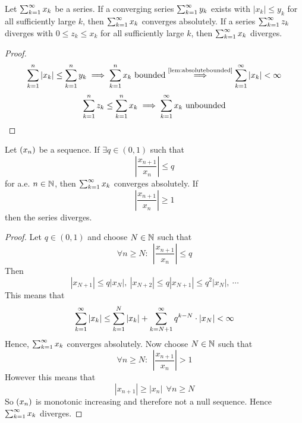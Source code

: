 \documentclass[../../script.tex]{subfiles}
\begin{document}
\begin{thm}
Let $\series{k} x_k$ be a series. If a converging series $\series{k} y_k$ exists with $|x_k| \le y_k$ for all sufficiently large $k$, then $\series{k} x_k$ converges absolutely. If a series $\series{k} z_k$ diverges with $0 \le z_k \le x_k$ for all sufficiently large $k$, then $\series{k} x_k$ diverges.
\end{thm}
\begin{proof}
\begin{equation}
	\series[n]{k} |x_k| \le \series[n]{k} y_k \implies \series[n]{k} x_k \text{ bounded} \implbl{\cref{lem:absolutebounded}} \series{k} |x_k| < \infty
\end{equation}
\begin{equation}
	\series[n]{k} z_k \le \series[n]{k} x_k \implies \series{k} x_k \text{ unbounded}
\end{equation}
\end{proof}

\begin{cor}
Let $\seq{x}$ be a sequence. If $\exists q \in (0, 1)$ such that
\[
	\left| \frac{x_{n+1}}{x_n} \right| \le q
\]
for a.e. $n \in \natn$, then $\series{k} x_k$ converges absolutely. If
\[
	\left| \frac{x_{n+1}}{x_n} \right| \ge 1
\]
then the series diverges.
\end{cor}
\begin{proof}
Let $q \in (0, 1)$ and choose $N \in \natn$ such that
\begin{equation}
	\forall n \ge N: ~~\left|\frac{x_{n+1}}{x_n}\right| \le q
\end{equation}
Then
\begin{equation}
	|x_{N+1}| \le q|x_N|, ~|x_{N+2}| \le q|x_{N+1}| \le q^2|x_N|, ~\cdots
\end{equation}
This means that
\begin{equation}
	\series{k} |x_k| \le \series[N]{k} |x_k| + \sum_{k=N+1}^\infty q^{k-N} \cdot |x_N| < \infty
\end{equation}
Hence, $\series{k} x_k$ converges absolutely. Now choose $N \in \natn$ such that
\begin{equation}
	\forall n \ge N: ~~\left|\frac{x_{n+1}}{x_n}\right| > 1
\end{equation}
However this means that
\begin{equation}
	|x_{n+1}| \ge |x_{n}| ~~\forall n \ge N
\end{equation}
So $\seq{x}$ is monotonic increasing and therefore not a null sequence. Hence $\series{k} x_k$ diverges.
\end{proof}
\end{document}
